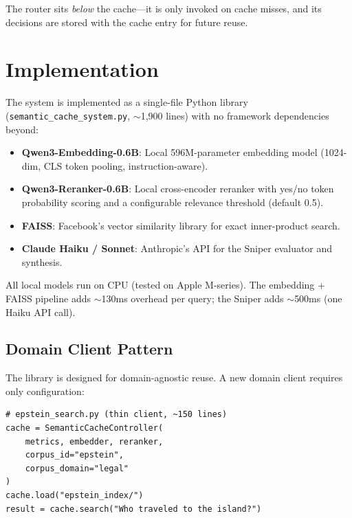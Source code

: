 \documentclass[11pt,twocolumn]{article}
\begin{document}
The router sits \textit{below} the cache---it is only invoked on cache misses, and its decisions are stored with the cache entry for future reuse.

\section{Implementation}
\label{sec:impl}

The system is implemented as a single-file Python library (\texttt{semantic\_cache\_system.py}, $\sim$1,900 lines) with no framework dependencies beyond:

\begin{itemize}
    \item \textbf{Qwen3-Embedding-0.6B}: Local 596M-parameter embedding model (1024-dim, CLS token pooling, instruction-aware).
    \item \textbf{Qwen3-Reranker-0.6B}: Local cross-encoder reranker with yes/no token probability scoring and a configurable relevance threshold (default 0.5).
    \item \textbf{FAISS}: Facebook's vector similarity library for exact inner-product search.
    \item \textbf{Claude Haiku / Sonnet}: Anthropic's API for the Sniper evaluator and synthesis.
\end{itemize}

All local models run on CPU (tested on Apple M-series). The embedding + FAISS pipeline adds $\sim$130ms overhead per query; the Sniper adds $\sim$500ms (one Haiku API call).

\subsection{Domain Client Pattern}

The library is designed for domain-agnostic reuse. A new domain client requires only configuration:

\begin{small}
\begin{verbatim}
# epstein_search.py (thin client, ~150 lines)
cache = SemanticCacheController(
    metrics, embedder, reranker,
    corpus_id="epstein",
    corpus_domain="legal"
)
cache.load("epstein_index/")
result = cache.search("Who traveled to the island?")
\end{verbatim}
\end{small}
\end{document}
